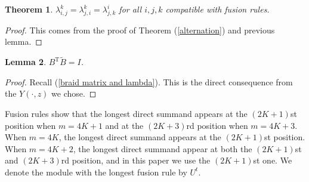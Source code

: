 \documentclass{article}
\newtheorem{lemma}{Lemma}[section]
\newtheorem{theorem}[lemma]{Theorem}
\newtheorem{proposition}[lemma]{Proposition}
\begin{document}
\begin{theorem}
$\lambda_{i,j}^k=\lambda_{j,i}^k=\lambda_{j,k}^i$ for all $i,j,k$ compatible with fusion rules.
\end{theorem}
\begin{proof}
This comes from the proof of Theorem (\ref{alternation}) and previous lemma.
\end{proof}

\begin{lemma}\label{partunitary}
$B^{\operatorname{T}}\tilde{B}=I$.
\end{lemma}
\begin{proof}
Recall (\ref{braid matrix and lambda}).
This is the direct consequence from the $Y(\cdot,z)$ we chose.
\end{proof}




Fusion rules show that the longest direct summand appears at the $(2K+1)$st position when $m=4K+1$ and at the $(2K+3)$rd position when $m=4K+3$.
When $m=4K$, the longest direct summand appears at the $(2K+1)$st position. 
When $m=4K+2$, the longest direct summand appear at both the $(2K+1)$st and $(2K+3)$rd position,
and in this paper we use the $(2K+1)$st one.
We denote the module with the longest fusion rule by $U^t$.

\end{document}
